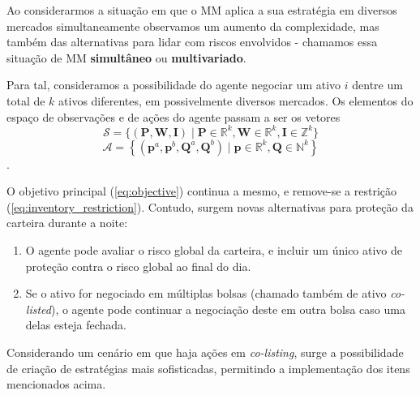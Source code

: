 Ao considerarmos a situação em que o MM aplica a sua estratégia em diversos mercados simultaneamente observamos um aumento da complexidade, mas também das alternativas para lidar com riscos envolvidos - chamamos essa situação de MM \textbf{simultâneo} ou \textbf{multivariado}.

Para tal, consideramos a possibilidade do agente negociar um ativo $i$ dentre um total de $k$ ativos diferentes, em possivelmente diversos mercados. Os elementos do espaço de observações e de ações do agente passam a ser os vetores 
\[ 
\mathcal{S} = \{(\mathbf{P}, \mathbf{W}, \mathbf{I}) \mid \mathbf{P} \in \mathbb{R}^{k}, \mathbf{W} \in \mathbb{R}^{k}, \mathbf{I} \in \mathbb{Z}^{k}\}
\]
\[
\mathcal{A} = \left\{ (\mathbf{p}^a, \mathbf{p}^b, \mathbf{Q}^a, \mathbf{Q}^b) \mid \mathbf{p} \in \mathbb{R}^{k},  \mathbf{Q} \in \mathbb{N}^{k} \right\}
\].

O objetivo principal (\ref{eq:objective}) continua a mesmo, e remove-se a restrição (\ref{eq:inventory_restriction}). Contudo, surgem novas alternativas para proteção da carteira durante a noite:

\begin{enumerate}
    \item O agente pode avaliar o risco global da carteira, e incluir um único ativo de proteção contra o risco global ao final do dia.
    \item Se o ativo for negociado em múltiplas bolsas (chamado também de ativo \textit{co-listed}), o agente pode continuar a negociação deste em outra bolsa caso uma delas esteja fechada.
\end{enumerate}

Considerando um cenário em que haja ações em \textit{co-listing}, surge a possibilidade de criação de estratégias mais sofisticadas, permitindo a implementação dos itens mencionados acima.
